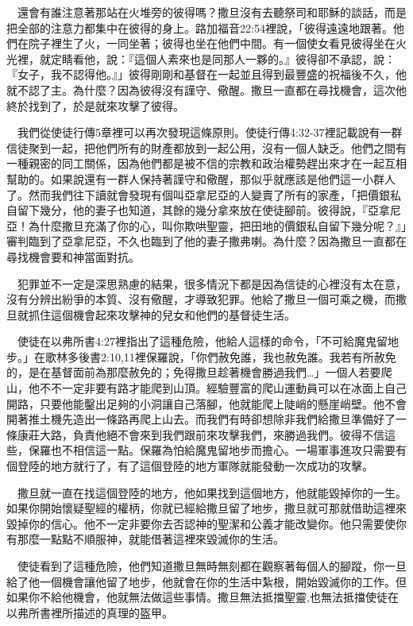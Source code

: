 \documentclass{book}
\begin{document}
　還會有誰注意著那站在火堆旁的彼得嗎？撒旦沒有去聽祭司和耶穌的談話，而是把全部的注意力都集中在彼得的身上。路加福音22:54裡說，「彼得遠遠地跟著。他們在院子裡生了火，一同坐著；彼得也坐在他們中間。有一個使女看見彼得坐在火光裡，就定睛看他，說：『這個人素來也是同那人一夥的。』彼得卻不承認，說：『女子，我不認得他。』」彼得剛剛和基督在一起並且得到最豐盛的祝福後不久，他就不認了主。為什麼？因為彼得沒有謹守、儆醒。撒旦一直都在尋找機會，這次他終於找到了，於是就來攻擊了彼得。

　我們從使徒行傳5章裡可以再次發現這條原則。使徒行傳4:32-37裡記載說有一群信徒聚到一起，把他們所有的財產都放到一起公用，沒有一個人缺乏。他們之間有一種親密的同工關係，因為他們都是被不信的宗教和政治權勢趕出來才在一起互相幫助的。如果說還有一群人保持著謹守和儆醒，那似乎就應該是他們這一小群人了。然而我們往下讀就會發現有個叫亞拿尼亞的人變賣了所有的家產，「把價銀私自留下幾分，他的妻子也知道，其餘的幾分拿來放在使徒腳前。彼得說，『亞拿尼亞！為什麼撒旦充滿了你的心，叫你欺哄聖靈，把田地的價銀私自留下幾分呢？』」審判臨到了亞拿尼亞，不久也臨到了他的妻子撒弗喇。為什麼？因為撒旦一直都在尋找機會要和神當面對抗。

　犯罪並不一定是深思熟慮的結果，很多情況下都是因為信徒的心裡沒有太在意，沒有分辨出紛爭的本質、沒有儆醒，才導致犯罪。他給了撒旦一個可乘之機，而撒旦就抓住這個機會起來攻擊神的兒女和他們的基督徒生活。

　使徒在以弗所書4:27裡指出了這種危險，他給人這樣的命令，「不可給魔鬼留地步。」在歌林多後書2:10,11裡保羅說，「你們赦免誰，我也赦免誰。我若有所赦免的，是在基督面前為那麼赦免的；免得撒旦趁著機會勝過我們…」一個人若要爬山，他不不一定非要有路才能爬到山頂。經驗豐富的爬山運動員可以在冰面上自己開路，只要他能鑿出足夠的小洞讓自己落腳，他就能爬上陡峭的懸崖峭壁。他不會開著推土機先造出一條路再爬上山去。而我們有時卻想除非我們給撒旦準備好了一條康莊大路，負責他絕不會來到我們跟前來攻擊我們，來勝過我們。彼得不信這些，保羅也不相信這一點。保羅為怕給魔鬼留地步而擔心。一場軍事進攻只需要有個登陸的地方就行了，有了這個登陸的地方軍隊就能發動一次成功的攻擊。

　撒旦就一直在找這個登陸的地方，他如果找到這個地方，他就能毀掉你的一生。如果你開始懷疑聖經的權柄，你就已經給撒旦留了地步，撒旦就可那就借助這裡來毀掉你的信心。他不一定非要你去否認神的聖潔和公義才能改變你。他只需要使你有那麼一點點不順服神，就能借著這裡來毀滅你的生活。

　使徒看到了這種危險，他們知道撒旦無時無刻都在觀察著每個人的腳蹤，你一旦給了他一個機會讓他留了地步，他就會在你的生活中紮根，開始毀滅你的工作。但如果你不給他機會，他就無法做這些事情。撒旦無法抵擋聖靈,也無法抵擋使徒在以弗所書裡所描述的真理的盔甲。
\end{document}
